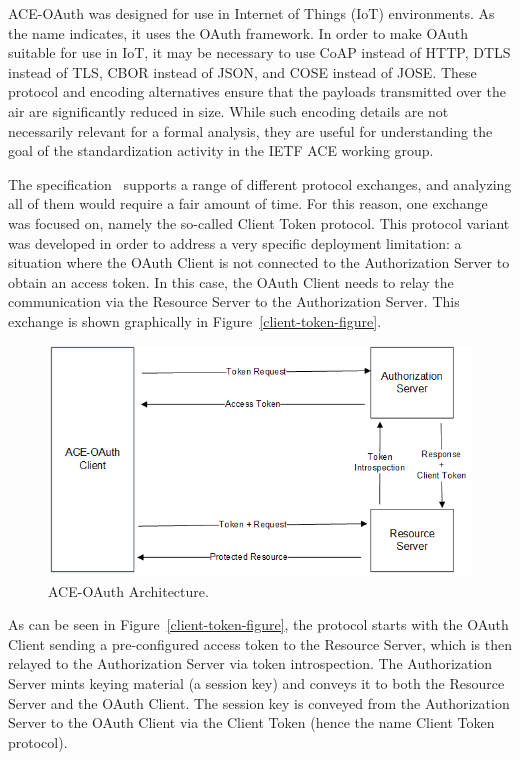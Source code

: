 \documentclass[peerreview, a4paper, 7pt]{IEEEtran}
\begin{document}
ACE-OAuth was designed for use in Internet of Things (IoT) environments. As the name indicates, it uses the OAuth framework. In order to make OAuth suitable for use in IoT, it may be necessary to use CoAP instead of HTTP, DTLS instead of TLS, CBOR instead of JSON, and COSE instead of JOSE. These protocol and encoding alternatives ensure that the payloads transmitted over the air are significantly reduced in size. While such encoding details are not necessarily relevant for a formal analysis, they are useful for understanding the goal of the standardization activity in the IETF ACE working group.  

The specification~\cite{draft-ietf-ace-oauth-authz-09} supports a range of different protocol exchanges, and analyzing all of them would require a fair amount of time. 
For this reason, one exchange was focused on, namely the so-called Client Token protocol. This protocol variant was developed in order to address a very specific deployment limitation: a situation where the OAuth Client is not connected to the Authorization Server to obtain an access token. In this case, the OAuth Client needs to relay the communication via the Resource Server to the Authorization Server. This exchange is shown graphically in Figure~\ref{client-token-figure}.

\begin{figure}[!htbp]
 \centering
 \includegraphics[scale=0.70]{ace-oauth-architecture.png}
 \caption{ACE-OAuth Architecture.}
 \label{ace-oauth-architecture-figure}
\end{figure}

As can be seen in Figure~\ref{client-token-figure}, the protocol starts with the OAuth Client sending a pre-configured access token to the Resource Server, which is then relayed to the Authorization Server via token introspection. The Authorization Server mints keying material (a session key) and conveys it to both the Resource Server and the OAuth Client. The session key is conveyed from the Authorization Server to the OAuth Client via the Client Token (hence the name Client Token protocol).
\end{document}
